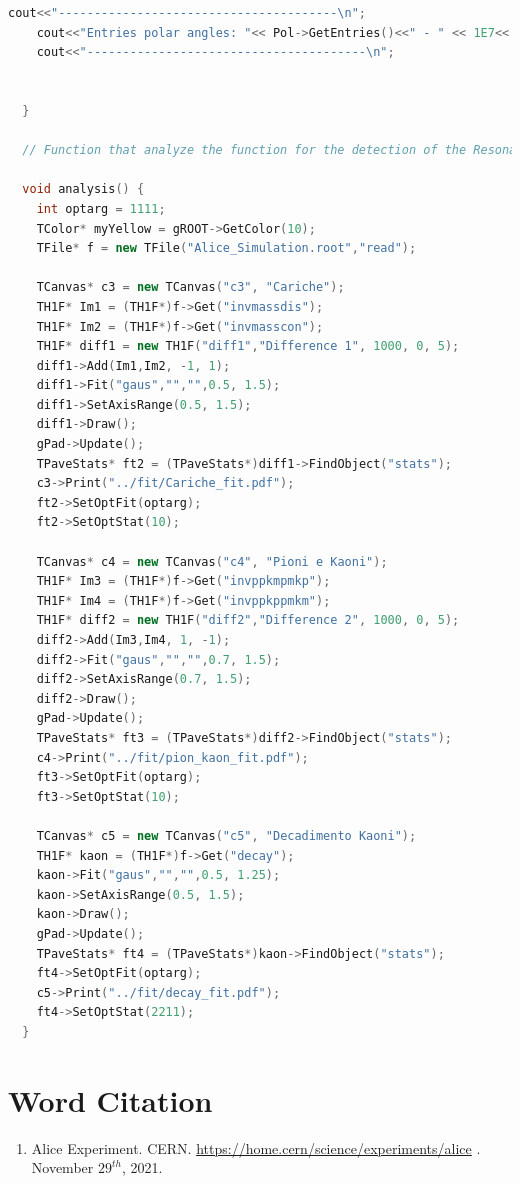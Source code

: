 \documentclass[a4paper, 11pt]{article}
\begin{document}
\begin{lstlisting}[language=c++, style=code]
    cout<<"---------------------------------------\n";
    cout<<"Entries polar angles: "<< Pol->GetEntries()<<" - " << 1E7<<'\n';
    cout<<"---------------------------------------\n";


  }

  // Function that analyze the function for the detection of the Resonance Kaon //////////

  void analysis() {
    int optarg = 1111;
    TColor* myYellow = gROOT->GetColor(10);
    TFile* f = new TFile("Alice_Simulation.root","read");

    TCanvas* c3 = new TCanvas("c3", "Cariche");
    TH1F* Im1 = (TH1F*)f->Get("invmassdis");
    TH1F* Im2 = (TH1F*)f->Get("invmasscon");
    TH1F* diff1 = new TH1F("diff1","Difference 1", 1000, 0, 5);
    diff1->Add(Im1,Im2, -1, 1);
    diff1->Fit("gaus","","",0.5, 1.5);
    diff1->SetAxisRange(0.5, 1.5);
    diff1->Draw();
    gPad->Update();
    TPaveStats* ft2 = (TPaveStats*)diff1->FindObject("stats");
    c3->Print("../fit/Cariche_fit.pdf");
    ft2->SetOptFit(optarg);
    ft2->SetOptStat(10);

    TCanvas* c4 = new TCanvas("c4", "Pioni e Kaoni");
    TH1F* Im3 = (TH1F*)f->Get("invppkmpmkp");
    TH1F* Im4 = (TH1F*)f->Get("invppkppmkm");
    TH1F* diff2 = new TH1F("diff2","Difference 2", 1000, 0, 5);
    diff2->Add(Im3,Im4, 1, -1);
    diff2->Fit("gaus","","",0.7, 1.5);
    diff2->SetAxisRange(0.7, 1.5);
    diff2->Draw();
    gPad->Update();
    TPaveStats* ft3 = (TPaveStats*)diff2->FindObject("stats");
    c4->Print("../fit/pion_kaon_fit.pdf");
    ft3->SetOptFit(optarg);
    ft3->SetOptStat(10);

    TCanvas* c5 = new TCanvas("c5", "Decadimento Kaoni");
    TH1F* kaon = (TH1F*)f->Get("decay");
    kaon->Fit("gaus","","",0.5, 1.25);
    kaon->SetAxisRange(0.5, 1.5);
    kaon->Draw();
    gPad->Update();
    TPaveStats* ft4 = (TPaveStats*)kaon->FindObject("stats");
    ft4->SetOptFit(optarg);
    c5->Print("../fit/decay_fit.pdf");
    ft4->SetOptStat(2211);
  }
      \end{lstlisting}

    \section* {Word Citation}
    \begin{enumerate}
      \item{Alice Experiment. CERN. \url{https://home.cern/science/experiments/alice} . November $29^{th}$, 2021.}
    \end{enumerate}
\end{document}
